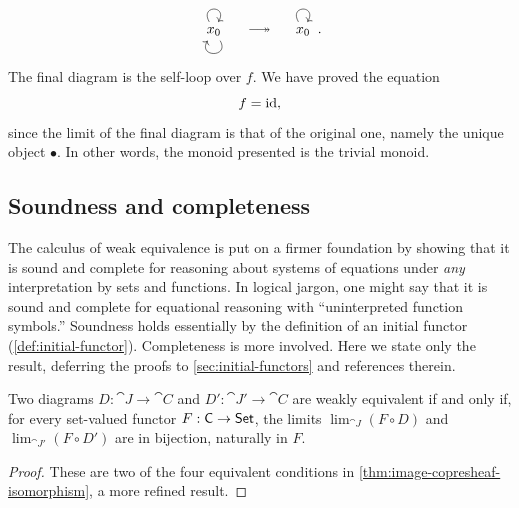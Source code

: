 \documentclass[11pt]{article}
\numberwithin{equation}{section}
\begin{document}
\begin{example}
\begin{equation*}
    \begin{tikzcd}
      {x_0}
      \arrow[from=1-1, to=1-1, loop, in=60, out=120, distance=5mm]
      \arrow[from=1-1, to=1-1, loop, in=240, out=300, distance=5mm]
    \end{tikzcd}
    \quad\longinitialto\quad
    \begin{tikzcd}
      {x_0}
      \arrow[from=1-1, to=1-1, loop, in=60, out=120, distance=5mm]
    \end{tikzcd}.
  \end{equation*}
  The final diagram is the self-loop over $f$. We have proved the equation
  \begin{equation*}
    f = \operatorname{id},
  \end{equation*}
  since the limit of the final diagram is that of the original one, namely the
  unique object $\bullet$. In other words, the monoid presented is the trivial monoid.
\end{example}

\subsection{Soundness and completeness}
\label{sec:soundness-completeness}

The calculus of weak equivalence is put on a firmer foundation by showing that
it is sound and complete for reasoning about systems of equations under
\emph{any} interpretation by sets and functions. In logical jargon, one might
say that it is sound and complete for equational reasoning with ``uninterpreted
function symbols.'' Soundness holds essentially by the definition of an initial
functor (\cref{def:initial-functor}). Completeness is more involved. Here we
state only the result, deferring the proofs to \cref{sec:initial-functors} and
references therein.

\begin{theorem}
  Two diagrams $D: \cat{J} \to \cat{C}$ and $D': \cat{J}' \to \cat{C}$ are
  weakly equivalent if and only if, for every set-valued functor
  $F: \mathsf{C} \to \mathsf{Set}$, the limits $\lim_{\cat{J}} (F \circ D)$ and
  $\lim_{\cat{J}'} (F \circ D')$ are in bijection, naturally in $F$.
\end{theorem}
\begin{proof}
  These are two of the four equivalent conditions in
  \cref{thm:image-copresheaf-isomorphism}, a more refined result.
\end{proof}
\end{document}

